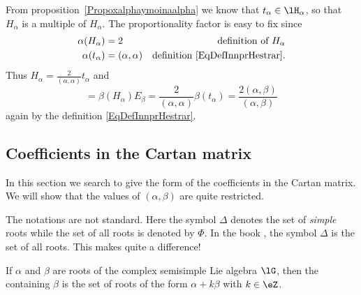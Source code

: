 From proposition~\ref{Propoxalphaymoinaalpha} we know that \( t_{\alpha}\in\lH_{\alpha}\), so that \( H_{\alpha}\) is a multiple of \( H_{\alpha}\). The proportionality factor is easy to fix since
\begin{equation}        \label{EqRealsHalpatalphaNorsmd}
    \begin{aligned}[]
        \alpha(H_{\alpha})&=2 &\text{definition of }H_{\alpha}\\
        \alpha(t_{\alpha})&=(\alpha,\alpha) &\text{definition \eqref{EqDefInnprHestrar}}.
    \end{aligned}
\end{equation}
Thus \( H_{\alpha}=\frac{ 2 }{ (\alpha,\alpha) }t_{\alpha}\) and
\begin{equation}
    [H_{\alpha},E_{\beta}]=\beta(H_{\alpha})E_{\beta}=\frac{ 2 }{ (\alpha,\alpha) }\beta(t_{\alpha})=\frac{ 2(\alpha,\beta) }{ (\alpha,\beta) }
\end{equation}
again by the definition \eqref{EqDefInnprHestrar}.

\subsection{Coefficients in the Cartan matrix}

In this section we search to give the form of the coefficients in the Cartan matrix. We will show that the values of \( (\alpha,\beta)\) are quite restricted.

\begin{remark}
    The notations are not standard. Here the symbol \( \Delta\) denotes the set of \emph{simple} roots while the set of all roots is denoted by \( \Phi\). In the book \cite{Cornwell}, the symbol \( \Delta\) is the set of all roots. This makes quite a difference!
\end{remark}

\begin{definition}
    If \( \alpha\) and \( \beta\) are roots of the complex semisimple Lie algebra \( \lG\), then the  containing \( \beta\) is the set of roots of the form \( \alpha+k\beta\) with \( k\in\eZ\).
\end{definition}

